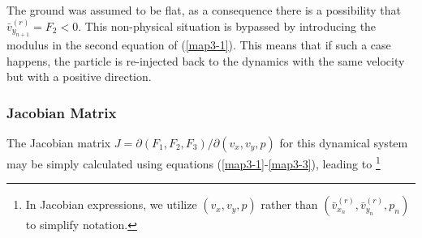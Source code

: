 \documentclass[reprint, aps, pre,nofootinbib]{revtex4-1}
\begin{document}
The ground was assumed to be flat, as a consequence there is a possibility
that $\bar{v}_{y_{n+1}}^{(r)}=F_{2}<0$. This non-physical situation
is bypassed by introducing the modulus in the second equation of (\ref{map3-1}).
This means that if such a case happens, the particle is re-injected
back to the dynamics with the same velocity but with a positive direction.

\subsubsection{Jacobian Matrix}

The Jacobian matrix $J=\partial\left(F_{1},F_{2},F_{3}\right)/\partial\left(v_{x},v_{y},p\right)$
for this dynamical system may be simply calculated using equations
(\ref{map3-1}-\ref{map3-3}), leading to \footnote{In Jacobian expressions, we utilize $(v_{x},v_{y},p)$ rather than
$(\bar{v}_{x_{n}}^{(r)},\bar{v}_{y_{n}}^{(r)},p_{n})$ to simplify
notation.}
\end{document}
